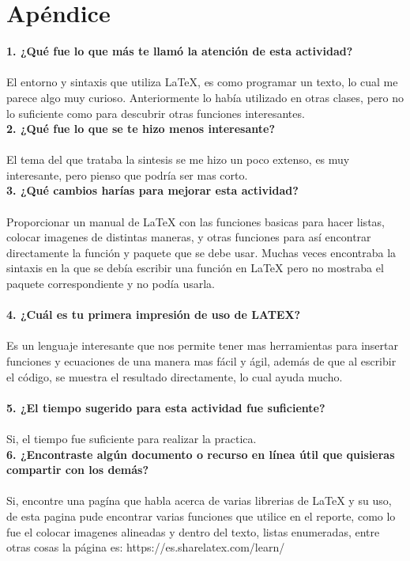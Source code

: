 \documentclass{article} %
\begin{document}
\section{Apéndice}

\textbf {1. ¿Qué fue lo que más te llamó la atención de esta actividad?}\\\\
El entorno y sintaxis que utiliza LaTeX, es como programar un texto, lo cual me parece algo muy curioso. Anteriormente lo había utilizado en otras clases, pero no lo suficiente como para descubrir otras funciones interesantes. \\

\noindent\textbf {2. ¿Qué fue lo que se te hizo menos interesante?}\\\\
El tema del que trataba la sintesis se me hizo un poco extenso, es muy interesante, pero pienso que podría ser mas corto. \\

\noindent\textbf {3. ¿Qué cambios harías para mejorar esta actividad?}\\\\
Proporcionar un manual de LaTeX con las funciones basicas para hacer listas, colocar imagenes de distintas maneras, y otras funciones para así encontrar directamente la función y paquete que se debe usar. Muchas veces encontraba la sintaxis en la que se debía escribir una función en LaTeX pero no mostraba el paquete correspondiente y no podía usarla. \\\\

\noindent\textbf {4. ¿Cuál es tu primera impresión de uso de LATEX?}\\\\
Es un lenguaje interesante que nos permite tener mas herramientas para insertar funciones y ecuaciones de una manera mas fácil y ágil, además de que al escribir el código, se muestra el resultado directamente, lo cual ayuda mucho. \\\\

\noindent\textbf {5. ¿El tiempo sugerido para esta actividad fue suficiente?} \\\\
Si, el tiempo fue suficiente para realizar la practica. \\

\noindent\textbf {6. ¿Encontraste algún documento o recurso en línea útil que quisieras compartir con los demás?} \\\\
Si, encontre una pagína que habla acerca de varias librerias de LaTeX y su uso, de esta pagina pude encontrar varias funciones que utilice en el reporte, como lo fue el colocar imagenes alineadas y dentro del texto, listas enumeradas, entre otras cosas la página es: https://es.sharelatex.com/learn/
\end{document}
